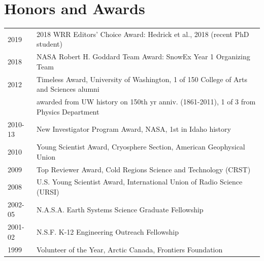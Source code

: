 \documentclass[11pt]{article}
\begin{document}
\section*{Honors and Awards}
\begin{tabular}{ll}
2019 & 2018 WRR Editors' Choice Award: Hedrick et al., 2018 (recent PhD student) \\
2018 & NASA Robert H. Goddard Team Award: SnowEx Year 1 Organizing Team \\
2012 & Timeless Award, University of Washington, 1 of 150 College of Arts and Sciences alumni  \\
& awarded from UW history on 150th yr anniv. (1861-2011), 1 of 3 from Physics Department \\
2010-13 & New Investigator Program Award, NASA, 1st in Idaho history \\
2010 & Young Scientist Award, Cryosphere Section, American Geophysical Union \\
2009 & Top Reviewer Award, Cold Regions Science and Technology (CRST) \\
2008 & U.S. Young Scientist Award, International Union of Radio Science (URSI) \\
2002-05 & N.A.S.A. Earth Systems Science Graduate Fellowship \\
2001-02 & N.S.F. K-12 Engineering Outreach Fellowship \\
1999 & Volunteer of the Year, Arctic Canada, Frontiers Foundation \\

\end{tabular}
\end{document}
